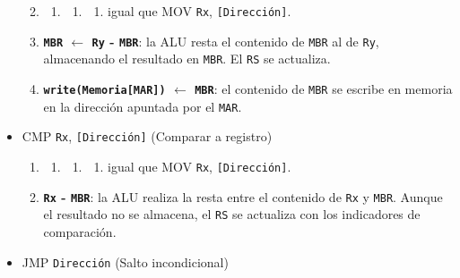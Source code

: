 \documentclass[12pt,oneside]{templates/unerthesis}
\providecommand{\tightlist}{%
  \setlength{\itemsep}{0pt}\setlength{\parskip}{0pt}}
\begin{document}
\begin{itemize}
  \begin{enumerate}
  \def\labelenumi{\arabic{enumi}.}
  \item
    \begin{enumerate}
    \def\labelenumii{\arabic{enumii}.}
    \setcounter{enumii}{1}
    \item
      \begin{enumerate}
      \def\labelenumiii{\arabic{enumiii}.}
      \setcounter{enumiii}{2}
      \item
        \begin{enumerate}
        \def\labelenumiv{\arabic{enumiv}.}
        \setcounter{enumiv}{3}
        \tightlist
        \item
          igual que MOV \texttt{Rx}, \texttt{{[}Dirección{]}}.
        \end{enumerate}
      \end{enumerate}
    \end{enumerate}
  \item
    \textbf{\texttt{MBR} \(\leftarrow\) \texttt{Ry} - \texttt{MBR}}:
    la ALU resta el contenido de \texttt{MBR} al de \texttt{Ry}, almacenando el resultado en \texttt{MBR}. El \texttt{RS} se actualiza.
  \item
    \textbf{\texttt{write(Memoria{[}MAR{]})} \(\leftarrow\) \texttt{MBR}}:
    el contenido de \texttt{MBR} se escribe en memoria en la dirección apuntada por el \texttt{MAR}.
  \end{enumerate}
\item
  CMP \texttt{Rx}, \texttt{{[}Dirección{]}} (Comparar a registro)

  \begin{enumerate}
  \def\labelenumi{\arabic{enumi}.}
  \item
    \begin{enumerate}
    \def\labelenumii{\arabic{enumii}.}
    \setcounter{enumii}{1}
    \item
      \begin{enumerate}
      \def\labelenumiii{\arabic{enumiii}.}
      \setcounter{enumiii}{2}
      \item
        \begin{enumerate}
        \def\labelenumiv{\arabic{enumiv}.}
        \setcounter{enumiv}{3}
        \tightlist
        \item
          igual que MOV \texttt{Rx}, \texttt{{[}Dirección{]}}.
        \end{enumerate}
      \end{enumerate}
    \end{enumerate}
  \item
    \textbf{\texttt{Rx} - \texttt{MBR}}:
    la ALU realiza la resta entre el contenido de \texttt{Rx} y \texttt{MBR}. Aunque el resultado no se almacena, el \texttt{RS} se actualiza con los indicadores de comparación.
  \end{enumerate}
\item
  JMP \texttt{Dirección} (Salto incondicional)


\end{itemize}
\end{document}
